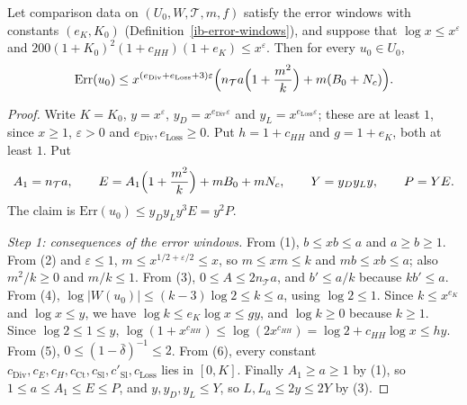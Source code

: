 \begin{lemma}\label{ib-error-size}
Let comparison data on $(U_0,W,\mathcal T,m,f)$ satisfy the error windows with
constants $(e_K,K_0)$ (Definition~\ref{ib-error-windows}), and suppose that
$\log x\leq x^\varepsilon$ and $200(1+K_0)^2(1+c_{HH})(1+e_K)\leq x^\varepsilon$.
Then for every $u_0\in U_0$,
\[
 \mathrm{Err}(u_0)\leq x^{(e_{\mathrm{Div}}+e_{\mathrm{Loss}}+3)\varepsilon}
 \Bigl(n_{\mathcal T}a\Bigl(1+\frac{m^2}k\Bigr)+m(B_0+N_c)\Bigr).
\]
\end{lemma}
\begin{proof}
Write $K=K_0$, $y=x^\varepsilon$, $y_D=x^{e_{\mathrm{Div}}\varepsilon}$ and
$y_L=x^{e_{\mathrm{Loss}}\varepsilon}$; these are at least $1$, since $x\geq1$,
$\varepsilon>0$ and $e_{\mathrm{Div}},e_{\mathrm{Loss}}\geq0$. Put $h=1+c_{HH}$ and
$g=1+e_K$, both at least $1$. Put
\[
 A_1=n_{\mathcal T}a,\qquad
 E=A_1\Bigl(1+\frac{m^2}k\Bigr)+mB_0+mN_c,\qquad Y=y_Dy_Ly,\qquad P=YE .
\]
The claim is $\mathrm{Err}(u_0)\leq y_Dy_Ly^3E=y^2P$.

\emph{Step 1: consequences of the error windows.} From (1), $b\leq xb\leq a$ and
$a\geq b\geq1$. From (2) and $\varepsilon\leq1$, $m\leq x^{1/2+\varepsilon/2}\leq x$,
so $m\leq xm\leq k$ and $mb\leq xb\leq a$; also $m^2/k\geq0$ and $m/k\leq1$. From
(3), $0\leq A\leq2n_{\mathcal T}a$, and $b'\leq a/k$ because $kb'\leq a$. From (4),
$\log|W(u_0)|\leq(k-3)\log2\leq k\leq a$, using $\log2\leq1$. Since
$k\leq x^{e_K}$ and $\log x\leq y$, we have $\log k\leq e_K\log x\leq gy$, and
$\log k\geq0$ because $k\geq1$. Since $\log2\leq1\leq y$,
$\log(1+x^{c_{HH}})\leq\log(2x^{c_{HH}})=\log2+c_{HH}\log x\leq hy$. From (5),
$0\leq(1-\bar\delta)^{-1}\leq2$. From (6), every constant $c_{\mathrm{Div}},c_E,c_H,
c_{\mathrm{Ct}},c_{\mathrm{Sl}},c'_{\mathrm{Sl}},c_{\mathrm{Loss}}$ lies in $[0,K]$.
Finally $A_1\geq a\geq1$ by (1), so $1\leq a\leq A_1\leq E\leq P$, and
$y,y_D,y_L\leq Y$, so $L,L_a\leq2y\leq2Y$ by (3).


\end{proof}
